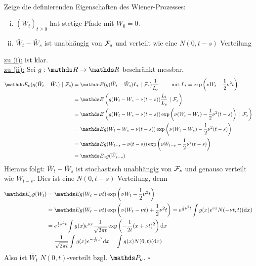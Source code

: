 \\
Zeige die definierenden Eigenschaften des Wiener-Prozesses:
\begin{enumerate}[(i)]
	\item $(\bar{W}_t)_{t\ge 0}$ hat stetige Pfade mit $\bar{W}_0=0$.
	\item $\bar{W}_t-\bar{W}_s$ ist unabhängig von $\mathcal{F}_s$ und verteilt wie eine $N(0,t-s)$ Verteilung
\end{enumerate}
\uline{zu (i):}
ist klar.\\
\uline{zu (ii):}
Sei $g:\R\to\R$ beschränkt messbar.
\begin{equation*}
\begin{aligned}
	\E_\nu (g(\bar{W}_t-\bar{W}_s)~|~\F_s) &= \E (g(\bar{W}_t-\bar{W}_s)L_t~|~\F_s)\frac{1}{L_s} \qquad \text{ mit } L_t=\exp\enbrace{\nu W_t-\frac{1}{2}\nu^2t}\\
	&= \E\enbrace{g(W_t-W_s-\nu(t-s))\frac{L_t}{L_s}~|~\F_s}\\
	&= \E\enbrace{g(W_t-W_s-\nu(t-s))\exp\enbrace{\nu(W_t-W_s)-\frac{1}{2}\nu^2(t-s)}~|~\F_s}\\
	&= \E g(W_t-W_s-\nu(t-s))\exp\enbrace{\nu(W_t-W_s)-\frac{1}{2}\nu^2(t-s)}\\
	&= \E g(W_{t-s}-\nu(t-s))\exp\enbrace{\nu W_{t-s}-\frac{1}{2}\nu^2(t-s)}\\
	&= \E_\nu g(\bar{W}_{t-s})
\end{aligned}
\end{equation*}
Hieraus folgt: $\bar{W}_t-\bar{W}_s$ ist stochastisch unabhängig von $\mathcal{F}_s$ und genauso verteilt wie $\bar{W}_{t-s}$.
Dies ist eine $N(0,t-s)$ Verteilung, denn
\begin{equation*}
\begin{aligned}
	\E_\nu g(\bar{W}_t) &= \E g(W_t-\nu t)\exp\enbrace{\nu W_t-\frac{1}{2}\nu^2 t}\\
	&= \E g(W_t-\nu t)\exp\enbrace{\nu (W_t-\nu t)+\frac{1}{2}\nu^2t} = e^{\frac{1}{2}\nu^2t}\int g(x)e^{\nu x}N(-\nu t,t)(\dint x)\\
	&= e^{\frac{1}{2}\nu^2t}\int g(x)e^{\nu x}\frac{1}{\sqrt{2\pi t}}\exp\enbrace{-\frac{1}{2t}(x+\nu t)^2}\dint x\\
	&= \frac{1}{\sqrt{2\pi t}}\int g(x)e^{-\frac{1}{2t}x^2}\dint x = \int g(x)N(0,t)(\dint x)
\end{aligned}
\end{equation*}
Also ist $ \bar{W}_t$ $N(0,t)$-verteilt bzgl. $\Pw_\nu$.
\hfill $\square$

